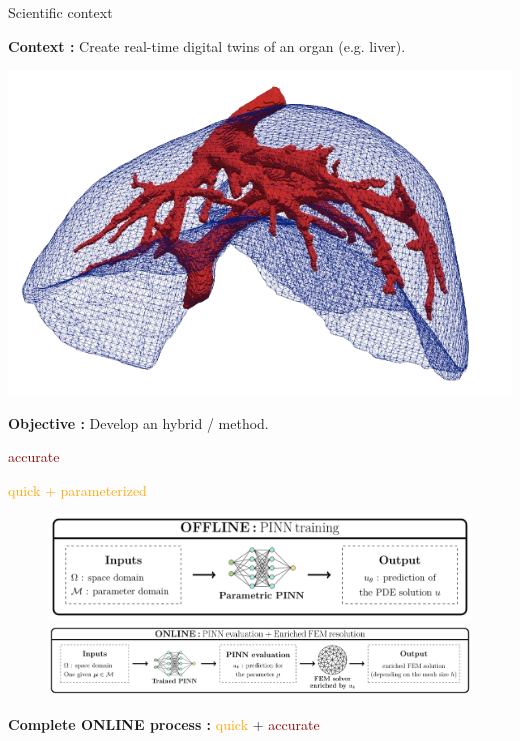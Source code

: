 \begin{frame}{Scientific context}
	\begin{minipage}{0.75\linewidth}
		\textbf{Context :} Create real-time digital twins of an organ (e.g. liver).
	\end{minipage}
	\begin{minipage}{0.21\linewidth}
		\vspace{-20pt}
		\includegraphics[width=\linewidth]{images/intro/liver.png}
	\end{minipage}
	
	\vspace{5pt}
	\textbf{Objective :} Develop an hybrid  /  method.
	
	\vspace{1pt}
	\small
	\hspace{130pt} \begin{minipage}{0.14\linewidth}
		\textcolor{darkred}{accurate}
	\end{minipage} \hspace{8pt} \begin{minipage}{0.3\linewidth}
		\textcolor{orange}{quick + parameterized}
	\end{minipage}

	\begin{figure}[!ht]
		\centering
		\includegraphics[width=0.7\linewidth]{images/intro/pipeline/offline.pdf}

		\includegraphics[width=\linewidth]{images/intro/pipeline/online.pdf}
	\end{figure}

	\begin{center}
		\textbf{Complete ONLINE process :} \textcolor{orange}{quick} + \textcolor{darkred}{accurate}
	\end{center}
\end{frame}

